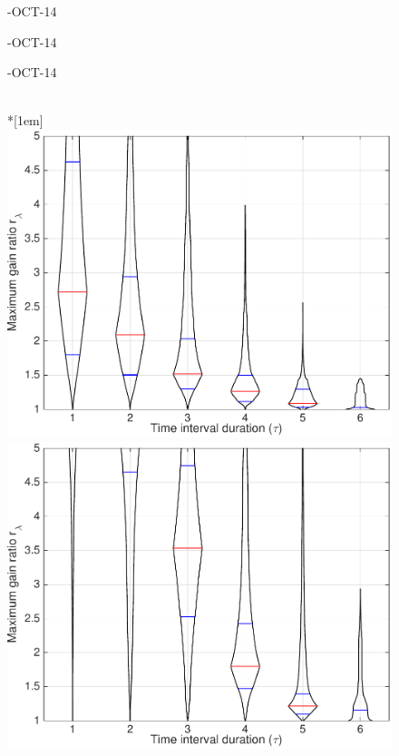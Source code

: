 \begin{figure}
\parbox{\mylength}{-OCT-14}
\parbox{\mylength}{-OCT-14}
\parbox{\mylength}{-OCT-14} \\*[1em]
\includegraphics[width=\mylength]{dist/20141102-maxGain-local-relativePerf}
\includegraphics[width=\mylength]{dist/20141103-maxGain-local-relativePerf}

\end{figure}
